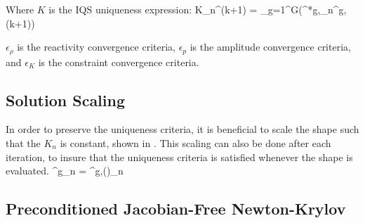 Where $K$ is the IQS uniqueness expression:
\be 
K_n^{(k+1)} = \sum_{g=1}^G\left(\phi^{*g},\varphi_n^{g,(k+1)}\right)
\label{eq:K}
\ee

$\epsilon_{\rho}$ is the reactivity convergence criteria, $\epsilon_{p}$ is the amplitude convergence criteria, and $\epsilon_{K}$ is the constraint convergence criteria.

\subsection{Solution Scaling}

In order to preserve the uniqueness criteria, it is beneficial to scale the shape such that the $K_n$ is constant, shown in .  This scaling can also be done after each iteration, to insure that the uniqueness criteria is satisfied whenever the shape is evaluated.
\be 
\varphi^{g}_n = \varphi^{g,()}_n 
\label{eq:shape_scale}
\ee

\subsection{Preconditioned Jacobian-Free Newton-Krylov}
\label{sect:pjfnk}


